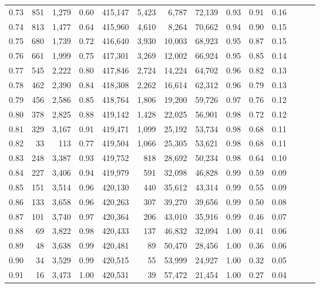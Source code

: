 \begin{tabular}{rrrrrrrrrrrrrr}
0.73 &    851 &  1,279 &  0.60 &  415,147 &    5,423 &   6,787 &  72,139 &  0.93 &  0.91 &      0.16 \\
0.74 &    813 &  1,477 &  0.64 &  415,960 &    4,610 &   8,264 &  70,662 &  0.94 &  0.90 &      0.15 \\
0.75 &    680 &  1,739 &  0.72 &  416,640 &    3,930 &  10,003 &  68,923 &  0.95 &  0.87 &      0.15 \\
0.76 &    661 &  1,999 &  0.75 &  417,301 &    3,269 &  12,002 &  66,924 &  0.95 &  0.85 &      0.14 \\
0.77 &    545 &  2,222 &  0.80 &  417,846 &    2,724 &  14,224 &  64,702 &  0.96 &  0.82 &      0.13 \\
0.78 &    462 &  2,390 &  0.84 &  418,308 &    2,262 &  16,614 &  62,312 &  0.96 &  0.79 &      0.13 \\
0.79 &    456 &  2,586 &  0.85 &  418,764 &    1,806 &  19,200 &  59,726 &  0.97 &  0.76 &      0.12 \\
0.80 &    378 &  2,825 &  0.88 &  419,142 &    1,428 &  22,025 &  56,901 &  0.98 &  0.72 &      0.12 \\
0.81 &    329 &  3,167 &  0.91 &  419,471 &    1,099 &  25,192 &  53,734 &  0.98 &  0.68 &      0.11 \\
0.82 &     33 &    113 &  0.77 &  419,504 &    1,066 &  25,305 &  53,621 &  0.98 &  0.68 &      0.11 \\
0.83 &    248 &  3,387 &  0.93 &  419,752 &      818 &  28,692 &  50,234 &  0.98 &  0.64 &      0.10 \\
0.84 &    227 &  3,406 &  0.94 &  419,979 &      591 &  32,098 &  46,828 &  0.99 &  0.59 &      0.09 \\
0.85 &    151 &  3,514 &  0.96 &  420,130 &      440 &  35,612 &  43,314 &  0.99 &  0.55 &      0.09 \\
0.86 &    133 &  3,658 &  0.96 &  420,263 &      307 &  39,270 &  39,656 &  0.99 &  0.50 &      0.08 \\
0.87 &    101 &  3,740 &  0.97 &  420,364 &      206 &  43,010 &  35,916 &  0.99 &  0.46 &      0.07 \\
0.88 &     69 &  3,822 &  0.98 &  420,433 &      137 &  46,832 &  32,094 &  1.00 &  0.41 &      0.06 \\
0.89 &     48 &  3,638 &  0.99 &  420,481 &       89 &  50,470 &  28,456 &  1.00 &  0.36 &      0.06 \\
0.90 &     34 &  3,529 &  0.99 &  420,515 &       55 &  53,999 &  24,927 &  1.00 &  0.32 &      0.05 \\
0.91 &     16 &  3,473 &  1.00 &  420,531 &       39 &  57,472 &  21,454 &  1.00 &  0.27 &      0.04 \\

\end{tabular}
